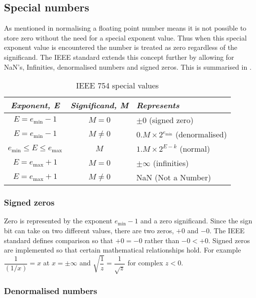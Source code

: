 \subsection{Special numbers}

As mentioned in  normalising a floating point number
means it is not possible to store zero without the need for a special exponent
value. Thus when this special exponent value is encountered the number is
treated as zero regardless of the significand. The IEEE standard extends this
concept further by allowing for NaN's, Infinities, denormalised numbers and
signed zeros. This is summarised in .

\begin{table}[htpb] \centering
  \begin{tabular}{|c|c|l|} \hline
    \emph{Exponent, E} & \emph{Significand, M} & \emph{Represents} \\
    \hline\hline
    $E=e_{\text{min}}-1$ & $M=0$ & $\pm 0$ (signed zero) \\
    $E=e_{\text{min}}-1$ & $M\neq 0$ & $0.M\times 2^{e_{\text{min}}}$ 
    (denormalised) \\
    $e_{\text{min}} \leq E \leq e_{\text{max}}$ & $M$ & $1.M \times 2^{E-k}$ 
    (normal) \\
    $E=e_{\text{max}}+1$ & $M=0$ & $\pm \infty$ (infinities) \\
    $E=e_{\text{max}}+1$ & $M\neq 0$ & NaN (Not a Number) \\ \hline
  \end{tabular}
  \caption{IEEE 754 special values}
  \label{tab:ieeespecialvalues}
\end{table}

\subsubsection{Signed zeros}

Zero is represented by the exponent $e_{\text{min}}-1$ and a zero significand.
Since the sign bit can take on two different values, there are two zeros, $+0$
and $-0$. The IEEE standard defines comparison so that $+0=-0$ rather than $-0
< +0$. Signed zeros are implemented so that certain mathematical relationships
hold. For example $\dfrac{1}{(1/x)}=x$ at $x=\pm \infty$ and
$\sqrt{\dfrac{1}{z}} = \dfrac{1}{\sqrt{z}}$ for complex $z<0$.

\subsubsection{Denormalised numbers}

